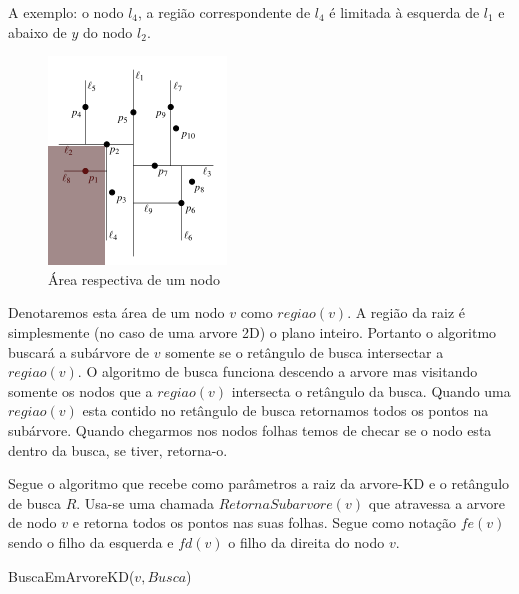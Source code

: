 A exemplo: o nodo \(l_4\), a região correspondente de \(l_4\) é limitada à esquerda de
\(l_1\) e abaixo de \(y\) do nodo \(l_2\).

\begin{figure}[htb]
    \caption{\label{fig:Fig_4} Área respectiva de um nodo}
    \begin{center}
        \includegraphics{images/kd_tree2.png}
    \end{center}
\end{figure}

Denotaremos esta área de um nodo \(v\) como \(regiao(v)\). A região da raiz é simplesmente
(no caso de uma arvore 2D) o plano inteiro.
Portanto o algoritmo buscará a subárvore de \(v\) somente se o retângulo de busca intersectar
a \(regiao(v)\).
O algoritmo de busca funciona descendo a arvore mas visitando somente os nodos que a
\(regiao(v)\) intersecta o retângulo da busca. Quando uma \(regiao(v)\) esta contido no
retângulo de busca retornamos todos os pontos na subárvore.
Quando chegarmos nos nodos folhas temos de checar se o nodo esta dentro da busca, se tiver,
retorna-o.

Segue o algoritmo que recebe como parâmetros a raiz da arvore-KD e o retângulo de busca \(R\).
Usa-se uma chamada \(RetornaSubarvore(v)\) que atravessa a arvore de nodo \(v\) e retorna
todos os pontos nas suas folhas. Segue como notação \(fe(v)\) sendo o filho da esquerda e
\(fd(v)\) o filho da direita do nodo \(v\).


\begin{algorithm}
    \caption{BuscaEmArvoreKD($v, Busca$)}
    \begin{algorithmic}
        \ELSE
        \ENDIF
    \end{algorithmic}
\end{algorithm}

